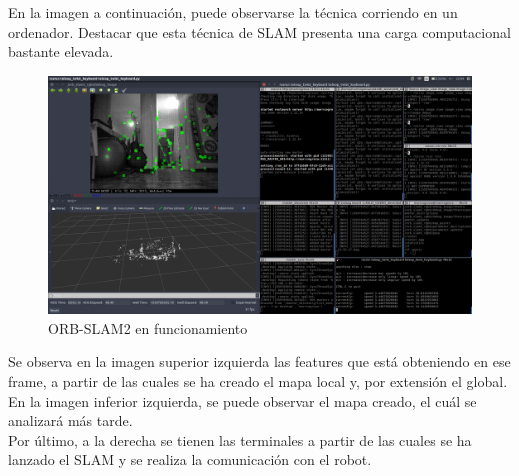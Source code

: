 En la imagen a continuación, puede observarse la técnica corriendo en un ordenador. Destacar que esta técnica de SLAM presenta una carga computacional bastante elevada.
\begin{figure}[h!]
    \centering
    \includegraphics[width=1\textwidth]{images/working_zone_orb}
    \caption{ORB-SLAM2 en funcionamiento}
\end{figure}

Se observa en la imagen superior izquierda las features que está obteniendo en ese frame, a partir de las cuales se ha creado el mapa local y,
por extensión el global. En la imagen inferior izquierda, se puede observar el mapa creado, el cuál se analizará más tarde.\\
Por último, a la derecha se tienen las terminales a partir de las cuales se ha lanzado el SLAM y se realiza la comunicación con el robot.\\

\newpage

